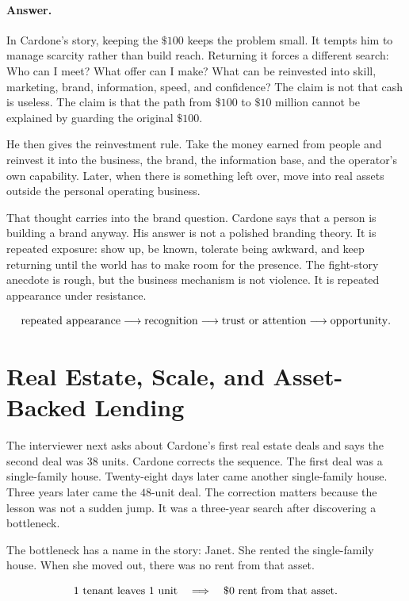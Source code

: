 \paragraph{Answer.} In Cardone's story, keeping the \(\$100\) keeps the problem small. It tempts him to manage scarcity rather than build reach. Returning it forces a different search: Who can I meet? What offer can I make? What can be reinvested into skill, marketing, brand, information, speed, and confidence? The claim is not that cash is useless. The claim is that the path from \(\$100\) to \(\$10\) million cannot be explained by guarding the original \(\$100\).

He then gives the reinvestment rule. Take the money earned from people and reinvest it into the business, the brand, the information base, and the operator's own capability. Later, when there is something left over, move into real assets outside the personal operating business.

That thought carries into the brand question. Cardone says that a person is building a brand anyway. His answer is not a polished branding theory. It is repeated exposure: show up, be known, tolerate being awkward, and keep returning until the world has to make room for the presence. The fight-story anecdote is rough, but the business mechanism is not violence. It is repeated appearance under resistance.

\[
\hbox{repeated appearance}
\longrightarrow
\hbox{recognition}
\longrightarrow
\hbox{trust or attention}
\longrightarrow
\hbox{opportunity}.
\]

\section{Real Estate, Scale, and Asset-Backed Lending}

The interviewer next asks about Cardone's first real estate deals and says the second deal was \(38\) units. Cardone corrects the sequence. The first deal was a single-family house. Twenty-eight days later came another single-family house. Three years later came the \(48\)-unit deal. The correction matters because the lesson was not a sudden jump. It was a three-year search after discovering a bottleneck.

The bottleneck has a name in the story: Janet. She rented the single-family house. When she moved out, there was no rent from that asset.

\begin{equation}
1\hbox{ tenant leaves }1\hbox{ unit}
\quad\Longrightarrow\quad
\$0\hbox{ rent from that asset}.
\end{equation}


